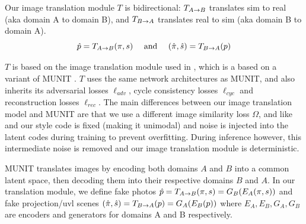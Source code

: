 \documentclass{article}
\begin{document}






		Our image translation module $T$ is bidirectional: $T_{A\rightarrow B}$ translates sim to real (aka domain A to domain B), and $T_{B\rightarrow A}$ translates real to sim (aka domain B to domain A).
		\begin{equation}
			\hat{p}=T_{A\rightarrow B}(\pi,s)  \ \ \ \text{ and }\ \ \   (\hat{\pi},\hat{s})=T_{B\rightarrow A}(p)
		\end{equation}
			
		$T$ is based on the image translation module used in \citet{surgical_video_translation}, which is a based on a variant \cite{surgical_image_translation} of MUNIT \cite{munit}. 
		$T$ uses the same network architectures as MUNIT, and also inherits its adversarial losses $\ell_{adv}$, cycle consistency losses $\ell_{cyc}$ and reconstruction losses $\ell_{rec}$.
		The main differences between our image translation model and MUNIT are that we use a different image similarity loss $\Omega$, and like \citet[]{surgical_image_translation} and \citet[]{surgical_video_translation} our style code is fixed (making it unimodal) and noise is injected into the latent codes during training to prevent overfitting. 
		During inference however, this intermediate noise is removed and our image translation module is deterministic. 

		MUNIT translates images by encoding both domains $A$ and $B$ into a common latent space, then decoding them into their respective domains  $B$ and $A$.
		In our translation module, we define fake photos $\hat{p} = T_{A\rightarrow B}(\pi,s) = G_B(E_A(\pi,s))$ and fake projection/uvl scenes $(\hat{\pi},\hat{s}) = T_{B\rightarrow A}(p) = G_A(E_B(p))$
			where $E_A, E_B, G_A, G_B$ are encoders and generators for domains A and B respectively.
\end{document}
